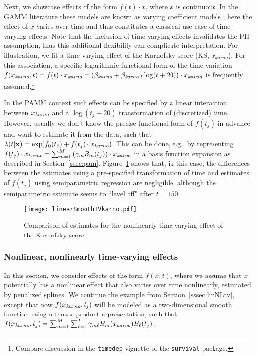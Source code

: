\documentclass[submit]{smj}
\newcommand{\bfx}{\mathbf{x}}
\newcommand{\code}[1]{{\small \texttt{#1}}}
\begin{document}
Next, we showcase effects of the form $f(t)\cdot x$, where
$x$ is continuous. In the GAMM literature these models are known as
varying coefficient models \citep{Hastie1993};
here the effect of $x$ varies over time and thus constitutes a classical use case
of time-varying effects. Note that the inclusion of time-varying effects
invalidates the PH assumption, thus this additional flexibility can complicate
interpretation. For illustration, we fit a time-varying effect of the
Karnofsky score (KS, $x_{karno}$). For this association, a specific logarithmic functional form
of the time variation
$
f(x_{\text{\emph{karno}}}, t)=f(t)\cdot x_{\text{\emph{karno}}} =
  \left(\beta_{\text{\emph{karno}}}  + \beta_{\text{\emph{karno}},t}\log(t+20)\right)\cdot x_{\text{\emph{karno}}}
$
is frequently assumed.\footnote{Compare discussion in the \code{timedep} vignette of
the \code{survival} package.}

In the PAMM context such effects can be specified by a linear interaction
between $x_{\text{\emph{karno}}}$ and a $\log(t_j+20)$ transformation of (discretized) time.
However, usually we don't know the precise functional form of $f(t_j)$ in advance and
want to estimate it from the data, such that
$\lambda(t|\bfx)=\exp(f_0(t_j) + f(t_j)\cdot x_{\text{\emph{karno}}})$.
This can be done, e.g., by representing $f(t_j)\cdot x_{\text{\emph{karno}}}=\sum_{m=1}^M \left(\gamma_{m} B_{m}(t_j)\right)\cdot x_{\text{\emph{karno}}}$ in a basis function expansion as described in Section~\ref{ssec:pam}.
Figure~\ref{fig:linSmoothTVKarno} shows that, in this case, the differences
between the estimates using a pre-specified transformation of time and estimates
of $f(t_j)$ using semiparametric regression are negligible,
although the semiparametric estimate seems to ``level off" after $t=150$.

\begin{figure}[!h]
\begin{center}
\texttt{[image: linearSmoothTVkarno.pdf]}
\end{center}
\vspace{-30pt}
\caption{Comparison of estimates for the nonlinearly time-varying effect
of the Karnofsky score.}
\label{fig:linSmoothTVKarno}
\end{figure}

\subsubsection{Nonlinear, nonlinearly time-varying effects}\label{sssec:nlNLtv}
In this section, we consider effects of the form $f(x,t)$, where we assume that
$x$ potentially has a nonlinear effect that also varies over time nonlinearly,
estimated by penalized splines. We continue the example from Section~\ref{sssec:linNLtv},
except that now $f(x_{\text{\emph{karno}}},t_j)$ will be modeled as a
two-dimensional smooth function using a tensor product representation, such that
$f(x_{\text{\emph{karno}}},t_j)=\sum_{m=1}^M\sum_{\ell=1}^{L}\gamma_{m\ell}B_m(x_{\text{\emph{karno}}})B_\ell(t_j)$.
\end{document}
